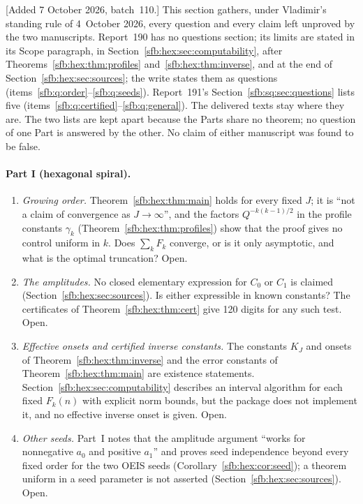\documentclass[11pt]{article}
\theoremstyle{remark}\newtheorem{remark}[theorem]{Remark}
\begin{document}
[Added 7 October 2026, batch~110.] This section gathers, under Vladimir's
standing rule of 4~October 2026, every question and every claim left
unproved by the two manuscripts. Report~190 has no questions section; its
limits are stated in its Scope paragraph, in
Section~\ref{sfb:hex:sec:computability}, after
Theorems~\ref{sfb:hex:thm:profiles} and~\ref{sfb:hex:thm:inverse}, and at the
end of Section~\ref{sfb:hex:sec:sources}; the write states them as questions
(items~\ref{sfb:q:order}--\ref{sfb:q:seeds}). Report~191's
Section~\ref{sfb:sq:sec:questions} lists five (items~\ref{sfb:q:certified}--\ref{sfb:q:general}).
The delivered texts stay where they are. The two lists are kept apart because
the Parts share no theorem; no question of one Part is answered by the other.
No claim of either manuscript was found to be false.

\paragraph{Part I (hexagonal spiral).}
\begin{enumerate}
\item\label{sfb:q:order} \emph{Growing order.} Theorem~\ref{sfb:hex:thm:main}
holds for every fixed $J$; it is ``not a claim of convergence as
$J\to\infty$'', and the factors $Q^{-k(k-1)/2}$ in the profile constants
$\gamma_k$ (Theorem~\ref{sfb:hex:thm:profiles}) show that the proof gives no
control uniform in $k$. Does $\sum_kF_k$ converge, or is it only asymptotic,
and what is the optimal truncation? Open.
\item\label{sfb:q:closed} \emph{The amplitudes.} No closed elementary
expression for $C_0$ or $C_1$ is claimed (Section~\ref{sfb:hex:sec:sources}).
Is either expressible in known constants? The certificates of
Theorem~\ref{sfb:hex:thm:cert} give 120 digits for any such test. Open.
\item\label{sfb:q:effective} \emph{Effective onsets and certified inverse
constants.} The constants $K_J$ and onsets of Theorem~\ref{sfb:hex:thm:inverse}
and the error constants of Theorem~\ref{sfb:hex:thm:main} are existence
statements. Section~\ref{sfb:hex:sec:computability} describes an interval
algorithm for each fixed $F_k(n)$ with explicit norm bounds, but the package
does not implement it, and no effective inverse onset is given. Open.
\item\label{sfb:q:seeds} \emph{Other seeds.} Part~I notes that the amplitude
argument ``works for nonnegative $a_0$ and positive $a_1$'' and proves seed
independence beyond every fixed order for the two OEIS seeds
(Corollary~\ref{sfb:hex:cor:seed}); a theorem uniform in a seed parameter is
not asserted (Section~\ref{sfb:hex:sec:sources}). Open.
\end{enumerate}
\end{document}
